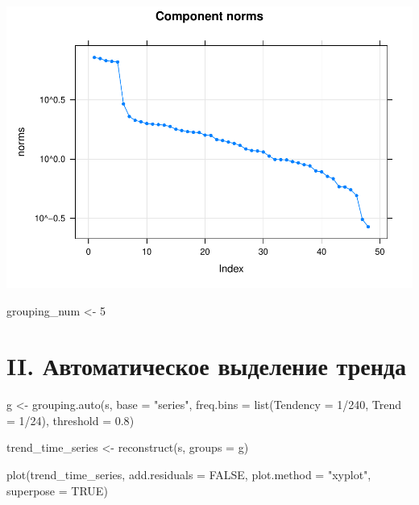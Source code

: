 \documentclass[specialist,
               substylefile = spbu_report.rtx,
               subf,href,colorlinks=true, 12pt]{disser}
\theoremstyle{definition}
\newenvironment{Shaded}{\begin{snugshade}}{\end{snugshade}}
\newcommand{\AttributeTok}[1]{\textcolor[rgb]{0.77,0.63,0.00}{#1}}
\newcommand{\ConstantTok}[1]{\textcolor[rgb]{0.00,0.00,0.00}{#1}}
\newcommand{\DecValTok}[1]{\textcolor[rgb]{0.00,0.00,0.81}{#1}}
\newcommand{\FloatTok}[1]{\textcolor[rgb]{0.00,0.00,0.81}{#1}}
\newcommand{\FunctionTok}[1]{\textcolor[rgb]{0.00,0.00,0.00}{#1}}
\newcommand{\NormalTok}[1]{#1}
\newcommand{\OtherTok}[1]{\textcolor[rgb]{0.56,0.35,0.01}{#1}}
\newcommand{\SpecialCharTok}[1]{\textcolor[rgb]{0.00,0.00,0.00}{#1}}
\newcommand{\StringTok}[1]{\textcolor[rgb]{0.31,0.60,0.02}{#1}}
\begin{document}
\includegraphics{iossa_example/eigen plot-1.pdf}

\begin{Shaded}
\begin{Highlighting}[]
\NormalTok{  grouping\_num }\OtherTok{\textless{}{-}} \DecValTok{5}
\end{Highlighting}
\end{Shaded}

\hypertarget{ii.-ux430ux432ux442ux43eux43cux430ux442ux438ux447ux435ux441ux43aux43eux435-ux432ux44bux434ux435ux43bux435ux43dux438ux435-ux442ux440ux435ux43dux434ux430}{%
\section{II. Автоматическое выделение
тренда}\label{ii.-ux430ux432ux442ux43eux43cux430ux442ux438ux447ux435ux441ux43aux43eux435-ux432ux44bux434ux435ux43bux435ux43dux438ux435-ux442ux440ux435ux43dux434ux430}}

\begin{Shaded}
\begin{Highlighting}[]
\NormalTok{  g }\OtherTok{\textless{}{-}} \FunctionTok{grouping.auto}\NormalTok{(s, }\AttributeTok{base =} \StringTok{"series"}\NormalTok{, }
                 \AttributeTok{freq.bins =} \FunctionTok{list}\NormalTok{(}\AttributeTok{Tendency =} \DecValTok{1}\SpecialCharTok{/}\DecValTok{240}\NormalTok{, }\AttributeTok{Trend =} \DecValTok{1}\SpecialCharTok{/}\DecValTok{24}\NormalTok{), }
                 \AttributeTok{threshold =} \FloatTok{0.8}\NormalTok{)}
                 
\NormalTok{  trend\_time\_series }\OtherTok{\textless{}{-}} \FunctionTok{reconstruct}\NormalTok{(s, }\AttributeTok{groups =}\NormalTok{ g)}
  
  \FunctionTok{plot}\NormalTok{(trend\_time\_series, }
   \AttributeTok{add.residuals =} \ConstantTok{FALSE}\NormalTok{, }
   \AttributeTok{plot.method =} \StringTok{"xyplot"}\NormalTok{, }\AttributeTok{superpose =} \ConstantTok{TRUE}\NormalTok{)}
\end{Highlighting}
\end{Shaded}
\end{document}

